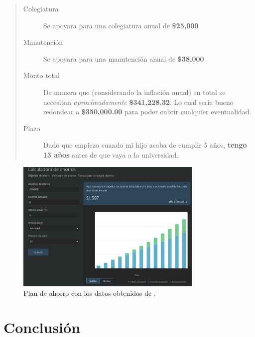 \documentclass[11pt]{article}
\begin{document}
	\begin{quote}
	\begin{description}
		\item [Colegiatura] Se apoyara para una colegiatura anual de \textbf{ \$25,000 }
		\item [Manutención] Se apoyara para una manutención anual de \textbf{ \$38,000 }
		\item [Monto total] De manera que (considerando la inflación anual) en total se necesitan \textit{ aproximadamente } \textbf{ \$341,228.32}. Lo cual seria bueno redondear a \textbf{ \$350,000.00} para poder cubrir cualquier eventualidad.
		\item [Plazo] Dado que empiezo cuando mi hijo acaba de cumplir 5 años, \textbf{tengo 13 años} antes de que vaya a la universidad.
	\end{description}
	\end{quote}
	
	\begin{figure}[htp]
		\centering
		\includegraphics[width=0.8\textwidth]{assets/R2_U1-calc_ahorro.png}
		\caption{Plan de ahorro con los datos obtenidos de \cite{calc 1}.}
		\label{}
	\end{figure}

\section{Conclusi\'on}
	
\end{document}

